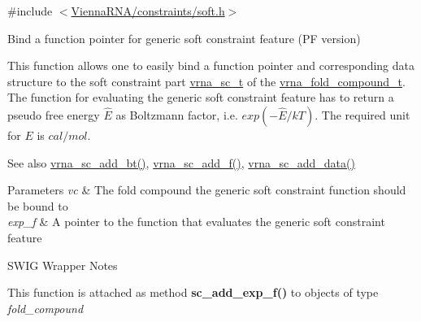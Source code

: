 {\ttfamily \#include $<$\mbox{\hyperlink{soft_8h}{Vienna\+R\+N\+A/constraints/soft.\+h}}$>$}



Bind a function pointer for generic soft constraint feature (PF version) 

This function allows one to easily bind a function pointer and corresponding data structure to the soft constraint part \mbox{\hyperlink{group__soft__constraints_ga75401ce219ef8dbcceb672db82d434c6}{vrna\+\_\+sc\+\_\+t}} of the \mbox{\hyperlink{group__fold__compound_ga1b0cef17fd40466cef5968eaeeff6166}{vrna\+\_\+fold\+\_\+compound\+\_\+t}}. The function for evaluating the generic soft constraint feature has to return a pseudo free energy $ \hat{E} $ as Boltzmann factor, i.\+e. $ exp(- \hat{E} / kT) $. The required unit for $ E $ is $ cal/mol $.

\begin{DoxySeeAlso}{See also}
\mbox{\hyperlink{group__soft__constraints_gabde7d07a79bb9a8f4721aee247b674ea}{vrna\+\_\+sc\+\_\+add\+\_\+bt()}}, \mbox{\hyperlink{group__soft__constraints_ga8c7d907ec0125cd61c04e0908010a4e9}{vrna\+\_\+sc\+\_\+add\+\_\+f()}}, \mbox{\hyperlink{group__soft__constraints_ga15c6d52471ec97897e2bb7f964f5deb6}{vrna\+\_\+sc\+\_\+add\+\_\+data()}}
\end{DoxySeeAlso}

\begin{DoxyParams}{Parameters}
{\em vc} & The fold compound the generic soft constraint function should be bound to \\
\hline
{\em exp\+\_\+f} & A pointer to the function that evaluates the generic soft constraint feature\\
\hline
\end{DoxyParams}
\begin{DoxyRefDesc}{S\+W\+I\+G Wrapper Notes}
\item[\mbox{\hyperlink{wrappers__wrappers000042}{S\+W\+I\+G Wrapper Notes}}]This function is attached as method {\bfseries{sc\+\_\+add\+\_\+exp\+\_\+f()}} to objects of type {\itshape fold\+\_\+compound} \end{DoxyRefDesc}

